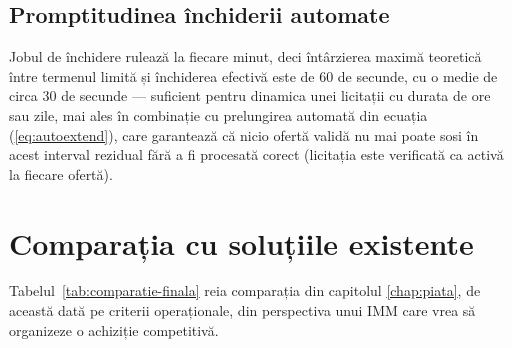 

\subsection{Promptitudinea închiderii automate}

Jobul de închidere rulează la fiecare minut, deci întârzierea maximă teoretică între termenul limită și închiderea efectivă este de 60 de secunde, cu o medie de circa 30 de secunde --- suficient pentru dinamica unei licitații cu durata de ore sau zile, mai ales în combinație cu prelungirea automată din ecuația (\ref{eq:autoextend}), care garantează că nicio ofertă validă nu mai poate sosi în acest interval rezidual fără a fi procesată corect (licitația este verificată ca activă la fiecare ofertă).

\section{Comparația cu soluțiile existente}

Tabelul~\ref{tab:comparatie-finala} reia comparația din capitolul \ref{chap:piata}, de această dată pe criterii operaționale, din perspectiva unui IMM care vrea să organizeze o achiziție competitivă.

